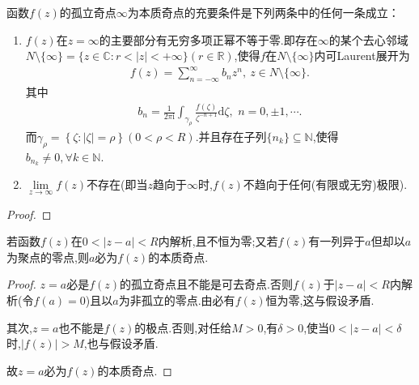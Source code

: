 \documentclass[../../main.tex]{subfiles}%
\begin{document}
\begin{theorem}
函数$f(z)$的孤立奇点$\infty$为本质奇点的充要条件是下列两条中的任何一条成立：
\begin{enumerate}[(1)]
\item $f(z)$在$z=\infty$的主要部分有无穷多项正幂不等于零.即存在$\infty$的某个去心邻域$N\setminus \{\infty\}=\{z\in \mathbb{C}:r<|z|<+\infty\}(r\in \mathbb{R})$,使得\( f \)在$N\setminus \{\infty\}$内可Laurent展开为
\begin{align*}
f(z)=\sum_{n=-\infty}^{\infty}{b_n z^n},\ z\in N\setminus\{\infty\}.
\end{align*}
其中
\begin{align*}
b_n=\frac{1}{2\pi \mathrm{i}}\int_{\gamma _{\rho}}{\frac{f\left( \zeta \right)}{\zeta^{-n+1}}\mathrm{d}\zeta},\,\,n=0,\pm 1,\cdots .
\end{align*}
而$\gamma _{\rho}=\left\{ \zeta :\left| \zeta \right|=\rho \right\}(0<\rho <R) .$并且存在子列$\{n_k\}\subseteq \mathbb{N}$,使得$b_{n_k}\neq 0,\forall k\in \mathbb{N}.$

\item $\lim\limits_{z \to \infty}f(z)$不存在(即当$z$趋向于$\infty$时,$f(z)$不趋向于任何(有限或无穷)极限).
\end{enumerate}
\end{theorem}
\begin{proof}



\end{proof}

\begin{theorem}\label{theorem:零点的聚点是本性奇点}
若函数$f(z)$在$0<|z-a|<R$内解析,且不恒为零;又若$f(z)$有一列异于$a$但却以$a$为聚点的零点,则$a$必为$f(z)$的本质奇点.
\end{theorem}
\begin{proof}

$z=a$必是$f(z)$的孤立奇点且不能是可去奇点.否则$f(z)$于$|z-a|<R$内解析(令$f(a)=0$)且以$a$为非孤立的零点.由必有$f(z)$恒为零,这与假设矛盾.

其次,$z=a$也不能是$f(z)$的极点.否则,对任给$M>0$,有$\delta>0$,使当$0<|z-a|<\delta$时,$|f(z)|>M$,也与假设矛盾.

故$z=a$必为$f(z)$的本质奇点.

\end{proof}
\end{document}

